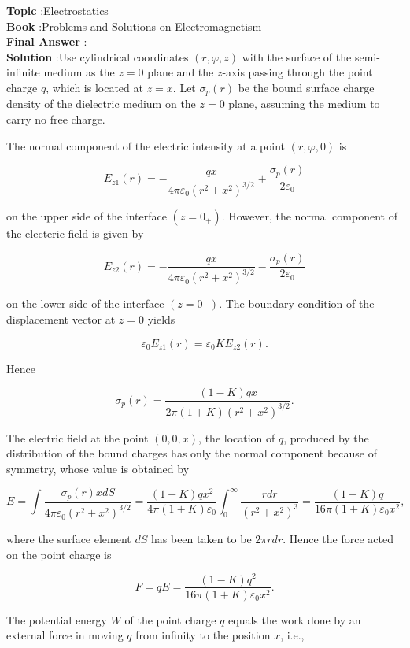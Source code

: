 \documentclass[10pt]{article}
\begin{document}
\textbf{Topic} :Electrostatics\\
\textbf{Book} :Problems and Solutions on Electromagnetism\\
\textbf{Final Answer} :-\\


\textbf{Solution} :Use cylindrical coordinates $(r, \varphi, z)$ with the surface of the semi-infinite medium as the $z=0$ plane and the $z$-axis passing through the point charge $q$, which is located at $z=x$. Let $\sigma_{p}(r)$ be the bound surface charge density of the dielectric medium on the $z=0$ plane, assuming the medium to carry no free charge.

The normal component of the electric intensity at a point $(r, \varphi, 0)$ is

$$
E_{z 1}(r)=-\frac{q x}{4 \pi \varepsilon_{0}\left(r^{2}+x^{2}\right)^{3 / 2}}+\frac{\sigma_{p}(r)}{2 \varepsilon_{0}}
$$

on the upper side of the interface $\left(z=0_{+}\right)$. However, the normal component of the electeric field is given by

$$
E_{z 2}(r)=-\frac{q x}{4 \pi \varepsilon_{0}\left(r^{2}+x^{2}\right)^{3 / 2}}-\frac{\sigma_{p}(r)}{2 \varepsilon_{0}}
$$

on the lower side of the interface $\left(z=0_{-}\right)$. The boundary condition of the displacement vector at $z=0$ yields

$$
\varepsilon_{0} E_{z 1}(r)=\varepsilon_{0} K E_{z 2}(r) .
$$



Hence

$$
\sigma_{p}(r)=\frac{(1-K) q x}{2 \pi(1+K)\left(r^{2}+x^{2}\right)^{3 / 2}} .
$$

The electric field at the point $(0,0, x)$, the location of $q$, produced by the distribution of the bound charges has only the normal component because of symmetry, whose value is obtained by

$$
E=\int \frac{\sigma_{p}(r) x d S}{4 \pi \varepsilon_{0}\left(r^{2}+x^{2}\right)^{3 / 2}}=\frac{(1-K) q x^{2}}{4 \pi(1+K) \varepsilon_{0}} \int_{0}^{\infty} \frac{r d r}{\left(r^{2}+x^{2}\right)^{3}}=\frac{(1-K) q}{16 \pi(1+K) \varepsilon_{0} x^{2}},
$$

where the surface element $d S$ has been taken to be $2 \pi r d r$. Hence the force acted on the point charge is

$$
F=q E=\frac{(1-K) q^{2}}{16 \pi(1+K) \varepsilon_{0} x^{2}} .
$$

The potential energy $W$ of the point charge $q$ equals the work done by an external force in moving $q$ from infinity to the position $x$, i.e.,
\end{document}
